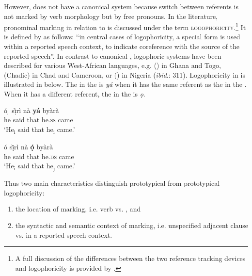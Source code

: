 \documentclass[output=paper
,newtxmath
,modfonts
,nonflat]{langsci/langscibook}
\begin{document}
However,  does not have a canonical  system because switch between referents is not marked by verb morphology but by free pronouns. In the literature, pronominal marking in relation to  is discussed under the term \textsc{logophoricity}.\footnote{A full discussion of the differences between the two reference tracking devices  and logophoricity is provided by \citet[50-56]{Stirling1993}.} It is defined by \citet[1]{Stirling1993} as follows: “in central cases of logophoricity, a special  form is used within a reported speech context, to indicate coreference with the source of the reported speech”. In contrast to canonical , logophoric systems have been described for various West-African languages, e.g.  () in Ghana and Togo,  (Chadic) in Chad and Cameroon, or  () in Nigeria (\textit{ibid}.: 311). Logophoricity in  is illustrated in  below. The   in the  is \textit{yá} when it has the same referent as the  in the . When it has a different referent, the  in the  is \textit{ọ}.

\ea\label{ex:apel:19}
{ \citep[19]{HymanComrie81}}
\gll   \'{o} ̣ s\`ịr\`i  nà  \textbf{yá} byàrà \\
     he said that he.\textsc{ss} came \\
\glt ‘He\textsubscript{i} said that he\textsubscript{i} came.’
\z

\ea
\gll ó sị̀rì  nà  \textbf{ọ́} byàrà\\
     he said that he.\textsc{ds} came \\
\glt ‘He\textsubscript{i} said that he\textsubscript{j} came.’
\z

Thus two main characteristics distinguish prototypical  from prototypical logophoricity: 

\begin{enumerate}
\item the location of marking, i.e. verb vs. , and 

\item the syntactic and semantic context of marking, i.e. unspecified adjacent clause vs.  in a reported speech context.
\end{enumerate}
\end{document}
